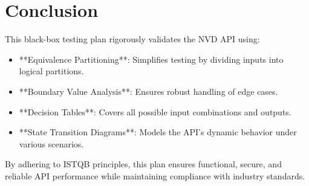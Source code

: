 \documentclass[a4paper,12pt]{article}
\begin{document}
\section*{Conclusion}
This black-box testing plan rigorously validates the NVD API using:
\begin{itemize}
    \item **Equivalence Partitioning**: Simplifies testing by dividing inputs into logical partitions.
    \item **Boundary Value Analysis**: Ensures robust handling of edge cases.
    \item **Decision Tables**: Covers all possible input combinations and outputs.
    \item **State Transition Diagrams**: Models the API’s dynamic behavior under various scenarios.
\end{itemize}

By adhering to ISTQB principles, this plan ensures functional, secure, and reliable API performance while maintaining compliance with industry standards.
\end{document}
